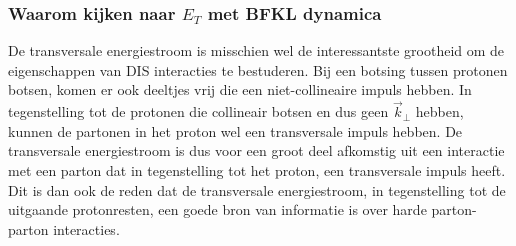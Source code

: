 \documentclass[a4paper,11pt]{article}
\numberwithin{equation}{section} %
\begin{document}
    \subsubsection{Waarom kijken naar $E_T$ met BFKL dynamica}
De transversale energiestroom is misschien wel de interessantste grootheid om de eigenschappen van DIS interacties te bestuderen.
Bij een botsing tussen protonen botsen, komen er ook deeltjes vrij die een niet-collineaire impuls hebben.
In tegenstelling tot de protonen die collineair botsen en dus geen $\vec{k}_\perp$ hebben, kunnen de partonen in het proton wel een transversale impuls hebben.
De transversale energiestroom is dus voor een groot deel afkomstig uit een interactie met een parton dat in tegenstelling tot het proton, een transversale impuls heeft.
Dit is dan ook de reden dat de transversale energiestroom, in tegenstelling tot de uitgaande protonresten, een goede bron van informatie is over harde parton-parton interacties.
\end{document}
